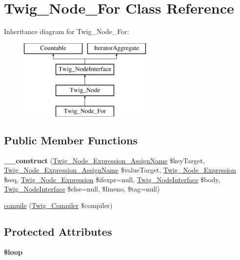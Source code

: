 \hypertarget{classTwig__Node__For}{}\section{Twig\+\_\+\+Node\+\_\+\+For Class Reference}
\label{classTwig__Node__For}
Inheritance diagram for Twig\+\_\+\+Node\+\_\+\+For\+:\begin{figure}[H]
\begin{center}
\leavevmode
\includegraphics[height=4.000000cm]{classTwig__Node__For}
\end{center}
\end{figure}
\subsection*{Public Member Functions}
\begin{DoxyCompactItemize}
\item 
{\bfseries \+\_\+\+\_\+construct} (\hyperlink{classTwig__Node__Expression__AssignName}{Twig\+\_\+\+Node\+\_\+\+Expression\+\_\+\+Assign\+Name} \$key\+Target, \hyperlink{classTwig__Node__Expression__AssignName}{Twig\+\_\+\+Node\+\_\+\+Expression\+\_\+\+Assign\+Name} \$value\+Target, \hyperlink{classTwig__Node__Expression}{Twig\+\_\+\+Node\+\_\+\+Expression} \$seq, \hyperlink{classTwig__Node__Expression}{Twig\+\_\+\+Node\+\_\+\+Expression} \$ifexpr=null, \hyperlink{interfaceTwig__NodeInterface}{Twig\+\_\+\+Node\+Interface} \$body, \hyperlink{interfaceTwig__NodeInterface}{Twig\+\_\+\+Node\+Interface} \$else=null, \$lineno, \$tag=null)\hypertarget{classTwig__Node__For_a187aef9fcbf6656c787c5a47801c0d2d}{}\label{classTwig__Node__For_a187aef9fcbf6656c787c5a47801c0d2d}

\item 
\hyperlink{classTwig__Node__For_ae32b621833e0ab0ca7bc86d24c1331b4}{compile} (\hyperlink{classTwig__Compiler}{Twig\+\_\+\+Compiler} \$compiler)
\end{DoxyCompactItemize}
\subsection*{Protected Attributes}
\begin{DoxyCompactItemize}
\item 
{\bfseries \$loop}\hypertarget{classTwig__Node__For_ae9e914c7a51d295aeeb1631b765fe03c}{}\label{classTwig__Node__For_ae9e914c7a51d295aeeb1631b765fe03c}

\end{DoxyCompactItemize}


